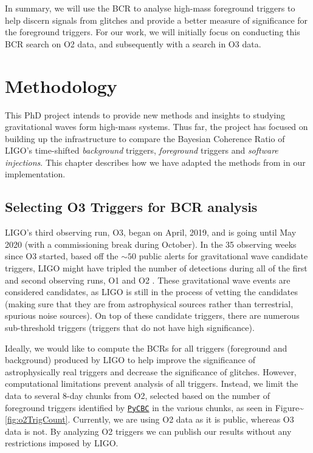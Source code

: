 \documentclass[%
 reprint,
 amsmath,amssymb,
 aps,
]{revtex4}
\begin{document}
In summary, we will use the BCR to analyse high-mass foreground triggers to help discern signals from glitches and
provide a better measure of significance for the foreground triggers. For our work, we will initially focus on
conducting this BCR search on O2 data, and subsequently with a search in O3 data.

\hypertarget{methodology}{%
\chapter{Methodology}\label{methodology}}

This PhD project intends to provide new methods and insights to studying gravitational waves form high-mass systems.
Thus far, the project has focused on building up the infrastructure to compare the Bayesian Coherence Ratio of LIGO's
time-shifted \emph{background} triggers, \emph{foreground} triggers and \emph{software injections}. This chapter describes how we have
adapted the methods from \citet{bcr_paper} in our implementation.

\hypertarget{selecting-o3-triggers-for-bcr-analysis}{%
\section{Selecting O3 Triggers for BCR analysis}\label{selecting-o3-triggers-for-bcr-analysis}}

LIGO's third observing run, O3, began on April, 2019, and is going until May 2020 (with a commissioning break during
October). In the 35 observing weeks since O3 started, based off the \(\sim50\) public alerts for gravitational wave
candidate triggers, LIGO might have tripled the number of detections during all of the first and second observing runs,
O1 and O2 \citep{gracedb}. These gravitational wave events are considered candidates, as LIGO is still in the process of vetting the
candidates (making sure that they are from astrophysical sources rather than terrestrial, spurious noise sources). On
top of these candidate triggers, there are numerous sub-threshold triggers (triggers that do not have high
significance).

Ideally, we would like to compute the BCRs for all triggers (foreground and background) produced by LIGO to help improve
the significance of astrophysically real triggers and decrease the significance of glitches. However, computational
limitations prevent analysis of all triggers. Instead, we limit the data to several 8-day chunks from O2, selected based
on the number of foreground triggers identified by \href{https://pycbc.org/}{\texttt{PyCBC}} in the various chunks, as seen in
Figure\textasciitilde\ref{fig:o2TrigCount}. Currently, we are using O2 data as it is public, whereas O3 data is not. By analyzing O2
triggers we can publish our results without any restrictions imposed by LIGO.
\end{document}
